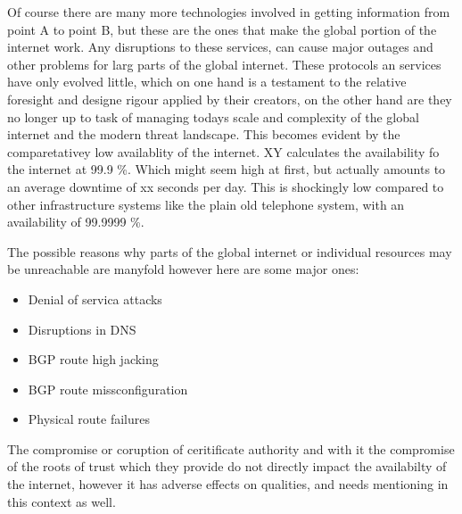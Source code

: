 \documentclass[../eva1_scion.tex]{subfiles}
\begin{document}
Of course there are many more technologies involved in getting information from point A to point B, but these are the ones that make the global portion of the internet work. Any disruptions to these services, can cause major outages and other problems for larg parts of the global internet. These protocols an services have only evolved little, which on one hand is a testament to the relative foresight and designe rigour applied by their creators, on the other hand are they no longer up to task of managing todays scale and complexity of the global internet and the modern threat landscape. This becomes evident by the comparetativey low availablity of the internet. XY calculates the availability fo the internet at 99.9 \%. Which might seem high at first, but actually amounts to an average downtime of xx seconds per day. This is shockingly low compared to other infrastructure systems like the plain old telephone system, with an availability of 99.9999 \%. 

The possible reasons why parts of the global internet or individual resources may be unreachable are manyfold however here are some major ones:

\begin{itemize}
    \item Denial of servica attacks
    \item Disruptions in DNS
    \item BGP route high jacking
    \item BGP route missconfiguration
    \item Physical route failures
\end{itemize}

The compromise or coruption of ceritificate authority and with it the compromise of the roots of trust which they provide do not directly impact the availabilty of the internet, however it has adverse effects on qualities, and needs mentioning in this context as well.
\end{document}
